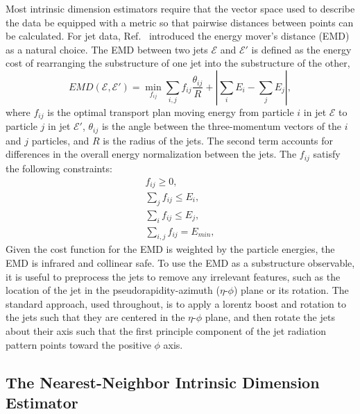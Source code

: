 Most intrinsic dimension estimators require that the vector space used to describe the data be equipped with a metric so that pairwise distances between points can be calculated.
For jet data, Ref.~\cite{Komiske:2019fks} introduced the energy mover's distance (EMD) as a natural choice.
The EMD between two jets $\mathcal{E}$ and $\mathcal{E'}$ is defined as the energy cost of rearranging the substructure of one jet into the substructure of the other,
\begin{equation}
  EMD(\mathcal{E}, \mathcal{E'}) = \min_{f_{ij}} \sum_{i,j} f_{ij} \frac{\theta_{ij}}{R} + | \sum_i E_i - \sum_j E_j |,
\end{equation}
where $f_{ij}$ is the optimal transport plan moving energy from particle $i$ in jet $\mathcal{E}$ to particle $j$ in jet $\mathcal{E'}$, $\theta_{ij}$ is the angle between the three-momentum vectors of the $i$ and $j$ particles, and $R$ is the radius of the jets.
The second term accounts for differences in the overall energy normalization between the jets.
The $f_{ij}$ satisfy the following constraints:
\begin{align}
  f_{ij} \geq 0, \\
  \sum_j f_{ij} \leq E_i, \\
  \sum_i f_{ij} \leq E_j, \\
  \sum_{i,j} f_{ij} = E_{min},
\end{align}
Given the cost function for the EMD is weighted by the particle energies, the EMD is infrared and collinear safe.
To use the EMD as a substructure observable, it is useful to preprocess the jets to remove any irrelevant features, such as the location of the jet in the pseudorapidity-azimuth ($\eta$-$\phi$) plane or its rotation.
The standard approach, used throughout, is to apply a lorentz boost and rotation to the jets such that they are centered in the $\eta$-$\phi$ plane, and then rotate the jets about their axis such that the first principle component of the jet radiation pattern points toward the positive $\phi$ axis.

\subsection{The Nearest-Neighbor Intrinsic Dimension Estimator}

